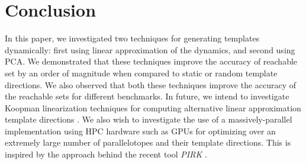 \chapter{Conclusion}
\label{chap:conclusion}
In this paper, we investigated two techniques for generating templates dynamically: first using linear approximation of the dynamics, and second using PCA.
%
We demonstrated that these techniques improve the accuracy of reachable set by an order of magnitude when compared to static or random template directions.
%
We also observed that both these techniques improve the accuracy of the reachable sets for different benchmarks.
%
In future, we intend to investigate Koopman linearization techniques for computing alternative linear approximation template directions \cite{bak2021reachability}.
%
We also wish to investigate the use of a massively-parallel implementation using HPC hardware such as GPUs for optimizing over an extremely large number of parallelotopes and their template directions. This is inspired by the approach behind the recent tool \emph{PIRK} \cite{devonport2020pirk}.
